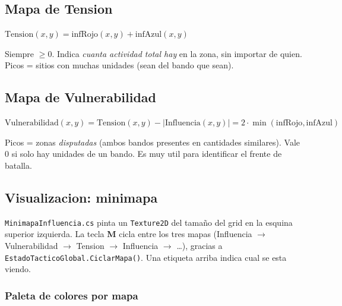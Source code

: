 \documentclass[12pt,a4paper]{article}
\begin{document}
\subsection{Mapa de Tension}

\begin{formulabox}
\centering
$\text{Tension}(x,y) = \text{infRojo}(x,y) + \text{infAzul}(x,y)$
\end{formulabox}

Siempre $\geq 0$. Indica \emph{cuanta actividad total hay} en la zona,
sin importar de quien. Picos = sitios con muchas unidades (sean del
bando que sean).

\subsection{Mapa de Vulnerabilidad}

\begin{formulabox}
\centering
$\text{Vulnerabilidad}(x,y) = \text{Tension}(x,y) - |\text{Influencia}(x,y)| = 2 \cdot \min(\text{infRojo}, \text{infAzul})$
\end{formulabox}

Picos = zonas \emph{disputadas} (ambos bandos presentes en cantidades
similares). Vale 0 si solo hay unidades de un bando. Es muy util para
identificar el frente de batalla.

\subsection{Visualizacion: minimapa}

\texttt{MinimapaInfluencia.cs} pinta un \texttt{Texture2D} del tamaño
del grid en la esquina superior izquierda. La tecla \textbf{M} cicla
entre los tres mapas (Influencia $\to$ Vulnerabilidad $\to$ Tension
$\to$ Influencia $\to$ \dots), gracias a
\texttt{EstadoTacticoGlobal.CiclarMapa()}. Una etiqueta arriba indica
cual se esta viendo.

\subsubsection*{Paleta de colores por mapa}
\end{document}
